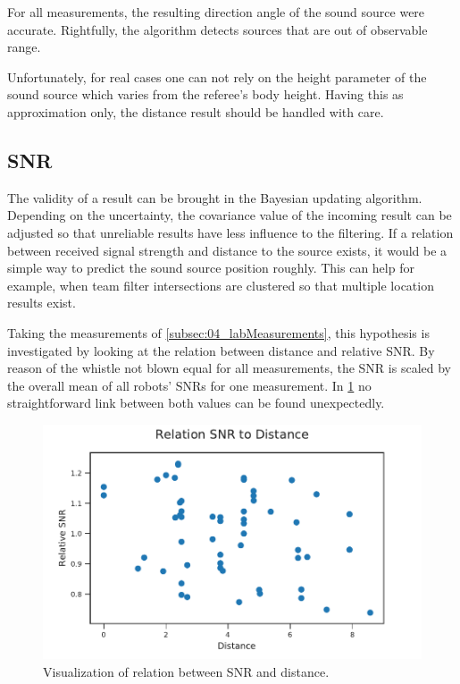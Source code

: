 For all measurements, the resulting direction angle of the sound source were
accurate.
Rightfully, the algorithm detects sources that are out of observable range.

Unfortunately, for real cases one can not rely on the height parameter of the sound
source which varies from the referee's body height.
Having this as approximation only, the distance result should be handled
with care.

\subsection{SNR}
\label{subsec:04_snr}

The validity of a result can be brought in the Bayesian updating algorithm.
Depending on the uncertainty, the covariance value of the incoming result can be adjusted
so that unreliable results have less influence to the filtering.
If a relation between received signal strength and distance to the source exists,
it would be a simple way to predict the sound source position roughly.
This can help for example, when team filter intersections are clustered so that
multiple location results exist.

Taking the measurements of \ref{subsec:04_labMeasurements}, this hypothesis is
investigated by looking at the relation between distance and relative \ac{SNR}.
By reason of the whistle not blown equal for all measurements,
the \ac{SNR} is scaled by the overall mean of all robots' \acp{SNR} for one
measurement.
In \cref{fig:04_snrDistance} no straightforward
link between both values can be found unexpectedly.
\begin{figure}[ht]
	\centering
	\includegraphics[]{figures/evaluation/snr_scatter}
	\caption{Visualization of relation between SNR and distance.}
	\label{fig:04_snrDistance}
\end{figure}

